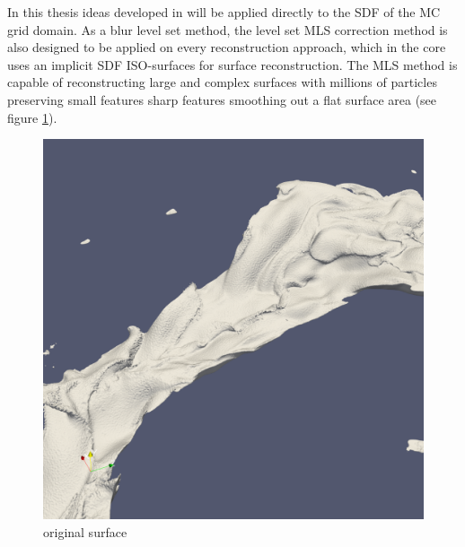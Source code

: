 In this thesis ideas developed in \cite{Apss} will be applied directly to the SDF of the MC grid domain. As a blur level set method, the level set MLS correction method is also designed to be applied on every reconstruction approach, which in the core uses an implicit SDF ISO-surfaces for surface reconstruction. The MLS method is capable of reconstructing large and complex surfaces with millions of particles preserving small features sharp features smoothing out a flat surface area (see figure \ref{fig:mls_motivation}).
\begin{figure}
	\begin{center}
			\includegraphics[width=\textwidth]{figures/CanionOriginal1.png}
	\end{center}
	\caption{original surface}
	\label{fig:mls_motivation}
\end{figure}
